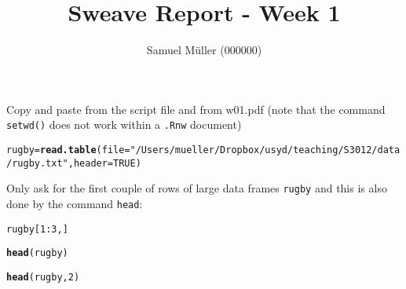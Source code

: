 \documentclass[a4paper]{article}\usepackage[]{graphicx}\usepackage[]{color}
\makeatletter
\newcommand{\hlnum}[1]{\textcolor[rgb]{0.686,0.059,0.569}{#1}}%
\newcommand{\hlstr}[1]{\textcolor[rgb]{0.192,0.494,0.8}{#1}}%
\newcommand{\hlopt}[1]{\textcolor[rgb]{0,0,0}{#1}}%
\newcommand{\hlstd}[1]{\textcolor[rgb]{0.345,0.345,0.345}{#1}}%
\newcommand{\hlkwb}[1]{\textcolor[rgb]{0.69,0.353,0.396}{#1}}%
\newcommand{\hlkwc}[1]{\textcolor[rgb]{0.333,0.667,0.333}{#1}}%
\newcommand{\hlkwd}[1]{\textcolor[rgb]{0.737,0.353,0.396}{\textbf{#1}}}%
\newenvironment{kframe}{%
 \def\at@end@of@kframe{}%
 \ifinner\ifhmode%
  \def\at@end@of@kframe{\end{minipage}}%
  \begin{minipage}{\columnwidth}%
 \fi\fi%
 \def\FrameCommand##1{\hskip\@totalleftmargin \hskip-\fboxsep
 \colorbox{shadecolor}{##1}\hskip-\fboxsep
     \hskip-\linewidth \hskip-\@totalleftmargin \hskip\columnwidth}%
 \MakeFramed {\advance\hsize-\width
   \@totalleftmargin\z@ \linewidth\hsize
   \@setminipage}}%
 {\par\unskip\endMakeFramed%
 \at@end@of@kframe}
\newenvironment{knitrout}{}{} %
\makeatother
\begin{document}



\title{Sweave Report - Week 1}
          \author{Samuel M\"uller (000000)}
          \maketitle

\medskip\noindent
Copy and paste from the script file and from w01.pdf (note that the command \texttt{setwd()} does not work within a \texttt{.Rnw} document)

\begin{knitrout}
\color{fgcolor}\begin{kframe}
\begin{alltt}
\hlstd{rugby} \hlkwb{=} \hlkwd{read.table}\hlstd{(}\hlkwc{file}\hlstd{=}\hlstr{"/Users/mueller/Dropbox/usyd/teaching/S3012/data/rugby.txt"}\hlstd{,}\hlkwc{header}\hlstd{=}\hlnum{TRUE}\hlstd{)}
\end{alltt}


{\ttfamily\noindent{}}

{\ttfamily\noindent\bfseries{}}\end{kframe}
\end{knitrout}

Only ask for the first couple of rows of large data frames \texttt{rugby} and this is also done by the command \texttt{head}:

\begin{knitrout}
\color{fgcolor}\begin{kframe}
\begin{alltt}
\hlstd{rugby[}\hlnum{1}\hlopt{:}\hlnum{3}\hlstd{,]}
\end{alltt}


{\ttfamily\noindent\bfseries\color{errorcolor}{\#\# Error in eval(expr, envir, enclos): object 'rugby' not found}}\begin{alltt}
\hlkwd{head}\hlstd{(rugby)}
\end{alltt}


{\ttfamily\noindent\bfseries\color{errorcolor}{\#\# Error in head(rugby): object 'rugby' not found}}\begin{alltt}
\hlkwd{head}\hlstd{(rugby,}\hlnum{2}\hlstd{)}
\end{alltt}


{\ttfamily\noindent\bfseries\color{errorcolor}{\#\# Error in head(rugby, 2): object 'rugby' not found}}\end{kframe}
\end{knitrout}
\end{document}
